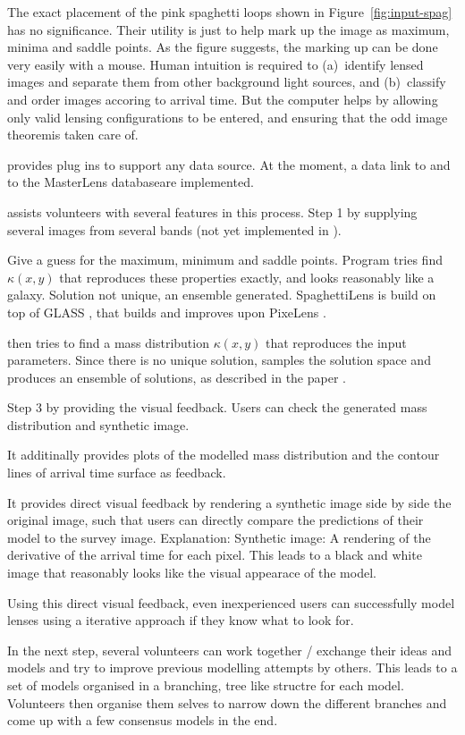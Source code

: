 The exact placement of the pink spaghetti loops shown in
Figure~\ref{fig:input-spag} has no significance.  Their utility is
just to help mark up the image as maximum, minima and saddle points.
As the figure suggests, the marking up can be done very easily with a
mouse.  Human intuition is required to (a)~identify lensed images and
separate them from other background light sources, and (b)~classify
and order images accoring to arrival time.  But the computer helps by
allowing only valid lensing configurations to be entered, and ensuring
that the odd image theorem\needcite is taken care of.

\spl provides plug ins to support any data source. At the moment, a data link to \sw and to the MasterLens database\needcite are implemented.

\spl assists volunteers with several features in this process.
Step 1 by supplying several images from several bands (not yet implemented in \sw).


Give a guess for the maximum, minimum and saddle points.  Program
tries find $\kappa(x,y)$ that reproduces these properties exactly, and
looks reasonably like a galaxy.  Solution not unique, an ensemble
generated.
SpaghettiLens is build on top of GLASS \citep{Lubini2012}, that builds and improves upon PixeLens \citep{Saha2004}.

\spl then tries to find a mass distribution $\kappa(x,y)$ that reproduces the input parameters.
Since there is no unique solution, \spl samples the solution space and produces an ensemble of solutions, as described in the paper \citep{Lubini2012}.

Step 3 by providing the visual feedback. Users can check the generated mass distribution and synthetic image.

It additinally provides plots of the modelled mass distribution and the contour lines of arrival time surface as feedback. 

It provides direct visual feedback by rendering a synthetic image side
by side the original image, such that users can directly compare the
predictions of their model to the survey image. Explanation: Synthetic
image: A rendering of the derivative of the arrival time for each
pixel. This leads to a black and white image that reasonably looks
like the visual appearace of the model.

Using this direct visual feedback, even inexperienced users can
successfully model lenses using a iterative approach if they know what
to look for.

In the next step, several volunteers can work together / exchange their ideas and models and try to improve previous modelling attempts by others.
This leads to a set of models organised in a branching, tree like structre for each model.
Volunteers then organise them selves to narrow down the different branches and come up with a few consensus models in the end.







